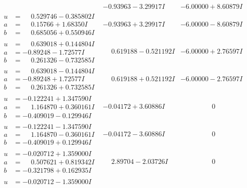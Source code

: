 \documentclass[1p]{elsarticle_modified}
\theoremstyle{definition}
\begin{document}
$$\begin{array}{c|c|c}
 & -0.93963 - 3.29917 I & -6.00000 + 8.60879 I \\ \hline\begin{aligned}
u &= \phantom{-}0.529746 - 0.385802 I \\
a &= \phantom{-}0.15766 + 1.68350 I \\
b &= \phantom{-}0.685056 + 0.550946 I\end{aligned}
 & -0.93963 + 3.29917 I & -6.00000 - 8.60879 I \\ \hline\begin{aligned}
u &= \phantom{-}0.639018 + 0.144804 I \\
a &= -0.89248 - 1.72577 I \\
b &= \phantom{-}0.261326 - 0.732585 I\end{aligned}
 & \phantom{-}0.619188 - 0.521192 I & -6.00000 + 2.76597 I \\ \hline\begin{aligned}
u &= \phantom{-}0.639018 - 0.144804 I \\
a &= -0.89248 + 1.72577 I \\
b &= \phantom{-}0.261326 + 0.732585 I\end{aligned}
 & \phantom{-}0.619188 + 0.521192 I & -6.00000 - 2.76597 I \\ \hline\begin{aligned}
u &= -0.122241 + 1.347590 I \\
a &= \phantom{-}1.164870 + 0.360161 I \\
b &= -0.409019 - 0.129946 I\end{aligned}
 & -0.04172 + 3.60886 I & \phantom{-0.000000 } 0 \\ \hline\begin{aligned}
u &= -0.122241 - 1.347590 I \\
a &= \phantom{-}1.164870 - 0.360161 I \\
b &= -0.409019 + 0.129946 I\end{aligned}
 & -0.04172 - 3.60886 I & \phantom{-0.000000 } 0 \\ \hline\begin{aligned}
u &= -0.020712 + 1.359000 I \\
a &= \phantom{-}0.507621 + 0.819342 I \\
b &= -0.321798 + 0.162935 I\end{aligned}
 & \phantom{-}2.89704 - 2.03726 I & \phantom{-0.000000 } 0 \\ \hline\begin{aligned}
u &= -0.020712 - 1.359000 I \\

\end{aligned}
\end{array}$$
\end{document}
